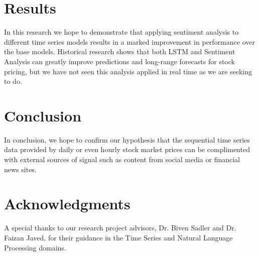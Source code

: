 \documentclass{llncs}
\begin{document}
\section{Results}

In this research we hope to demonstrate that applying sentiment analysis to different time series models results in a marked improvement in performance over the base models. Historical research shows that both LSTM and Sentiment Analysis can greatly improve predictions and long-range forecasts for stock pricing, but we have not seen this analysis applied in real time as we are seeking to do.


\section{Conclusion}

In conclusion, we hope to confirm our hypothesis that the sequential time series data provided by daily or even hourly stock market prices can be complimented with external sources of signal such as content from social media or financial news sites.

\section{Acknowledgments}

A special thanks to our research project advisors, Dr. Biven Sadler and Dr. Faizan Javed, for their guidance in the Time Series and Natural Language Processing domains.


%
%
%
% 
% 
%
\end{document}
